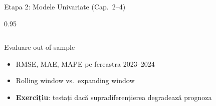 \documentclass[9pt, aspectratio=169, t]{beamer}
\begin{document}
\begin{frame}{Etapa 2: Modele Univariate (Cap.\ 2--4)}
\begin{cminipage}{0.95\textwidth}
{\begin{columns}[T]
            \vspace{0.15cm}

            \begin{block}{Evaluare out-of-sample}
                \begin{itemize}\setlength{\itemsep}{0pt}
                    \item RMSE, MAE, MAPE pe fereastra 2023--2024
                    \item Rolling window vs.\ expanding window
                    \item \textbf{Exercițiu}: testați dacă supradiferențierea degradează prognoza
                \end{itemize}
            \end{block}
        \end{columns}
        }
    \end{cminipage}
\end{frame}
\end{document}
